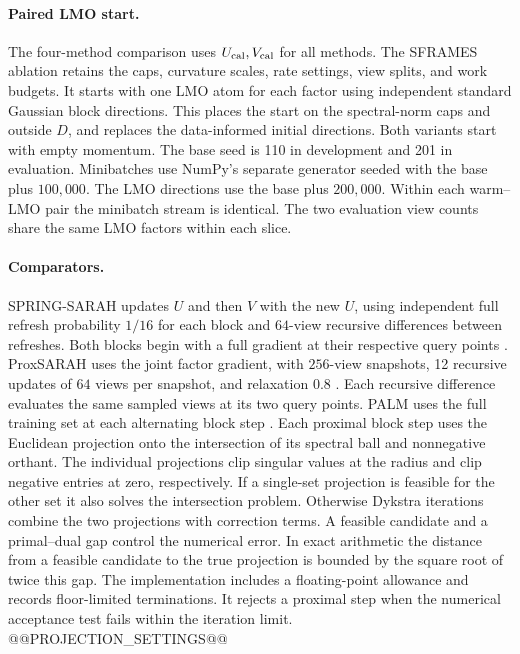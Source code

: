 \documentclass[11pt]{article}
\begin{document}
\paragraph{Paired LMO start.}
The four-method comparison uses \(U_{\rm cal},V_{\rm cal}\) for all methods. The SFRAMES ablation retains the caps, curvature scales, rate settings, view splits, and work budgets. It starts with one LMO atom for each factor using independent standard Gaussian block directions. This places the start on the spectral-norm caps and outside \(D\), and replaces the data-informed initial directions. Both variants start with empty momentum. The base seed is 110 in development and 201 in evaluation. Minibatches use NumPy's separate generator seeded with the base plus \(100{,}000\). The LMO directions use the base plus \(200{,}000\). Within each warm--LMO pair the minibatch stream is identical. The two evaluation view counts share the same LMO factors within each slice.

\paragraph{Comparators.}
SPRING-SARAH updates \(U\) and then \(V\) with the new \(U\), using independent full refresh probability \(1/16\) for each block and \(64\)-view recursive differences between refreshes. Both blocks begin with a full gradient at their respective query points \cite{spring}. ProxSARAH uses the joint factor gradient, with \(256\)-view snapshots, 12 recursive updates of \(64\) views per snapshot, and relaxation \(0.8\) \cite{proxsarah}. Each recursive difference evaluates the same sampled views at its two query points. PALM uses the full training set at each alternating block step \cite{palm}. Each proximal block step uses the Euclidean projection onto the
intersection of its spectral ball and nonnegative orthant. The individual
projections clip singular values at the radius and clip negative entries
at zero, respectively. If a single-set projection is feasible for the
other set it also solves the intersection problem. Otherwise Dykstra
iterations combine the two projections with correction terms. A feasible
candidate and a primal--dual gap control the numerical error. In exact
arithmetic the distance from a feasible candidate to the true projection
is bounded by the square root of twice this gap. The implementation
includes a floating-point allowance and records floor-limited terminations.
It rejects a proximal step when the numerical acceptance test fails within
the iteration limit. @@PROJECTION_SETTINGS@@
\end{document}
